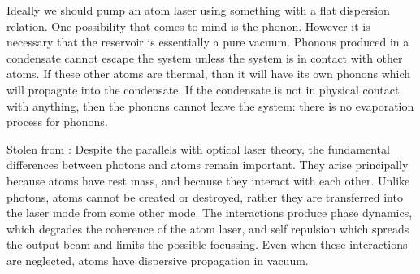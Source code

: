 Ideally we should pump an atom laser using something with a flat dispersion relation.  One possibility that comes to mind is the phonon.  However it is necessary that the reservoir is essentially a pure vacuum.  Phonons produced in a condensate cannot escape the system unless the system is in contact with other atoms.  If these other atoms are thermal, than it will have its own phonons which will propagate into the condensate.  If the condensate is not in physical contact with anything, then the phonons cannot leave the system: there is no evaporation process for phonons.

Stolen from \citep{Ballagh:2000oq}:
Despite the parallels with optical laser theory, the fundamental differences between photons and atoms remain important. They arise principally because atoms have rest mass, and because they interact with each other. Unlike photons, atoms cannot be created or destroyed, rather they are transferred into the laser mode from some other mode. The interactions produce phase dynamics, which degrades the coherence of the atom laser, and self repulsion which spreads the output beam and limits the possible focussing. Even when these interactions are neglected, atoms have dispersive propagation in vacuum.

